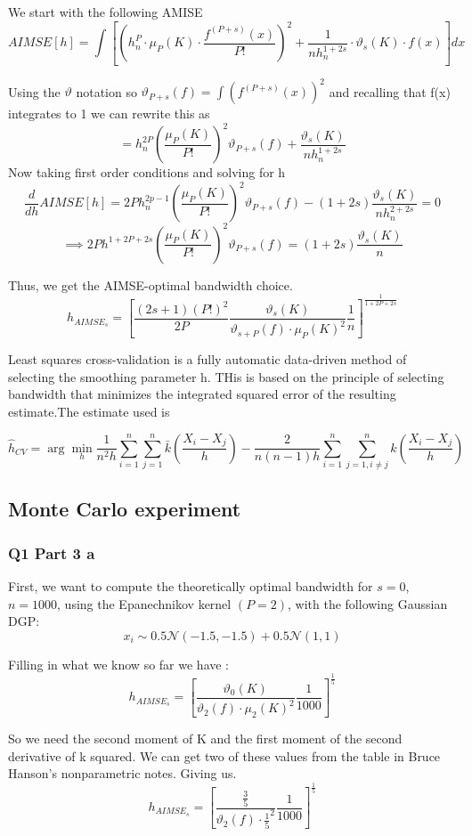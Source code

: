 \documentclass[11pt]{article}
\newcommand{\N}{\mathcal{N}}
\begin{document}
We start with the following AMISE
$$ AIMSE[h] = \int \left[ \left( h_n^P \cdot \mu_P(K) \cdot \frac{f^{(P+s)}(x)}{P!}   \right)^2 + \frac{1}{nh_n^{1+2s}} \cdot \vartheta_s(K) \cdot f(x) \right]dx
$$

Using the $\vartheta$ notation so $\vartheta_{P+s}(f) = \int(f^{(P+s)}(x))^2$ and recalling that f(x) integrates to 1 we can rewrite this as 
$$ =  h_n^{2P} \left( \frac{\mu_P(K)}{P!} \right)^2 \vartheta_{P+s}(f) + \frac{\vartheta_s(K)}{nh_n^{1+2s}}
$$
Now taking first order conditions and solving for h 
$$ \frac{d}{dh}AIMSE[h] =  2Ph_n^{2p-1} \left( \frac{\mu_P(K)}{P!} \right)^2 \vartheta_{P+s}(f) -(1+2s) \frac{\vartheta_s(K)}{nh_n^{2+2s}} =0
$$
$$ \implies 2Ph^{1+2P+2s}\left( \frac{\mu_P(K)}{P!} \right)^2 \vartheta_{P+s}(f) = (1+2s) \frac{\vartheta_s(K)}{n}
$$

Thus, we get the AIMSE-optimal bandwidth choice.
$$h_{AIMSE_s} = \left[ \frac{(2s+1)(P!)^2}{2P} \frac{\vartheta_s(K)}{\vartheta_{s+P}(f) \cdot \mu_P(K)^2} \frac{1}{n} \right]^{\frac{1}{1+2P+2s}}$$

Least squares cross-validation is a fully automatic data-driven method of selecting the smoothing parameter h. THis is based on the principle of selecting bandwidth that minimizes the integrated squared error of the resulting estimate.The estimate used is 

$$ \hat{h}_{CV} = \arg \min_{h} \frac{1}{n^2h} \sum_{i=1}^n \sum_{j=1}^n \bar{k} \left(\frac{X_i - X_j}{h}\right) - \frac{2}{n(n-1)h}\sum_{i=1}^n\sum_{j=1, i\neq j}^nk\left(\frac{X_i - X_j}{h}\right)
$$


\subsection{Monte Carlo experiment}

\subsubsection{Q1 Part 3 a} First, we want to compute the theoretically optimal bandwidth for $s=0$, $n=1000$, using the Epanechnikov kernel $(P=2)$, with the following Gaussian DGP:
$$x_i \sim 0.5 \N(-1.5,-1.5) + 0.5\N(1,1)$$

Filling in what we know so far we have : 
$$h_{AIMSE_s} = \left[ \frac{\vartheta_0(K)}{\vartheta_{2}(f) \cdot \mu_2(K)^2} \frac{1}{1000} \right]^{\frac{1}{5}}$$

So we need the second moment of K and the first moment of the second derivative of k squared. We can get two of these values from the table in Bruce Hanson's nonparametric notes. Giving us. 
$$h_{AIMSE_s} = \left[ \frac{\frac{3}{5}}{\vartheta_{2}(f) \cdot \frac{1}{5}^2} \frac{1}{1000} \right]^{\frac{1}{5}}$$
\end{document}

